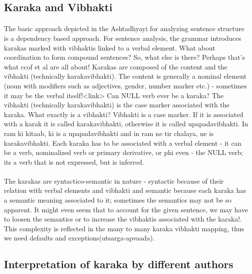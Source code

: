 \documentclass[a4paper,10pt]{article}
\begin{document}
\subsection{Karaka and Vibhakti}
\paragraph{}The basic approach depicted in the Ashtadhyayi for analyzing sentence structure is a dependency based approach. \color{blue!100}For sentence analysis, the grammar introduces karakas marked with vibhaktis linked to a verbal element. \color{red!100}What about coordination to form compound sentences? So, what else is there? \color{green!100}Perhaps that's what ccof et al are all about! \color{black!100}Karakas are composed of the content and the vibhakti (technically karakavibhakti). \color{blue!100}The content is generally a nominal element (noun with modifiers such as adjectives, gender, number marker etc.) - \color{green!100}sometimes it may be the verbal itself!<link> \color{red!100}Can NULL verb ever be a karaka? \color{blue!100}The vibhakti (technically karakavibhakti) is the case marker associated with the karaka. \color{red!100}What exactly is a vibhakti? \color{blue!100}Vibhakti is a case marker. If it is associated with a karak it is called karakavibhakti, otherwise it is called upapadavibhakti. \color{purple!100}In ram ki kitaab, ki is a upapadavibhakti and in ram ne tir chalaya, ne is karakavibhakti. \color{black!100}Each karaka has to be associated with a verbal element - it can be a verb, \color{blue!100}nominalized verb or primary derivative, or phi even - the NULL verb; its a verb that is not expressed, but is inferred.\paragraph{}\color{black!100}The karakas are syntactico-semantic in nature - \color{blue!100}syntactic because of their relation with verbal elements and vibhakti and semantic because each karaka has a semantic meaning associated to it; \color{red!100}sometimes the semantics may not be so apparent. It might even seem that to account for the given sentence, we may have to loosen the semantics or to increase the vibhaktis associated with the karaka!. \color{black!100}This complexity is reflected in the many to many karaka vibhakti mapping, thus we need defaults and exceptions(utsarga-apvaada).
\subsection{Interpretation of karaka by different authors}
\end{document}
